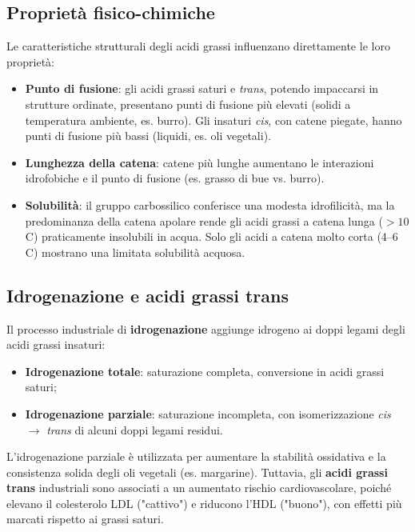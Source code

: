 \documentclass[12pt,a4paper]{report}
\begin{document}
\subsection{Proprietà fisico-chimiche}
Le caratteristiche strutturali degli acidi grassi influenzano direttamente le loro proprietà:
\begin{itemize}
\item \textbf{Punto di fusione}: gli acidi grassi saturi e \textit{trans}, potendo impaccarsi in strutture ordinate, presentano punti di fusione più elevati (solidi a temperatura ambiente, es. burro). Gli insaturi \textit{cis}, con catene piegate, hanno punti di fusione più bassi (liquidi, es. oli vegetali).
\item \textbf{Lunghezza della catena}: catene più lunghe aumentano le interazioni idrofobiche e il punto di fusione (es. grasso di bue vs. burro).
\item \textbf{Solubilità}: il gruppo carbossilico conferisce una modesta idrofilicità, ma la predominanza della catena apolare rende gli acidi grassi a catena lunga (\(>10\) C) praticamente insolubili in acqua. Solo gli acidi a catena molto corta (4--6 C) mostrano una limitata solubilità acquosa.
\end{itemize}
\subsection{Idrogenazione e acidi grassi trans}
Il processo industriale di \textbf{idrogenazione} aggiunge idrogeno ai doppi legami degli acidi grassi insaturi:
\begin{itemize}
\item \textbf{Idrogenazione totale}: saturazione completa, conversione in acidi grassi saturi;
\item \textbf{Idrogenazione parziale}: saturazione incompleta, con isomerizzazione \textit{cis} \(\rightarrow\) \textit{trans} di alcuni doppi legami residui.
\end{itemize}
L'idrogenazione parziale è utilizzata per aumentare la stabilità ossidativa e la consistenza solida degli oli vegetali (es. margarine). Tuttavia, gli \textbf{acidi grassi trans} industriali sono associati a un aumentato rischio cardiovascolare, poiché elevano il colesterolo LDL ("cattivo") e riducono l'HDL ("buono"), con effetti più marcati rispetto ai grassi saturi.
\end{document}
